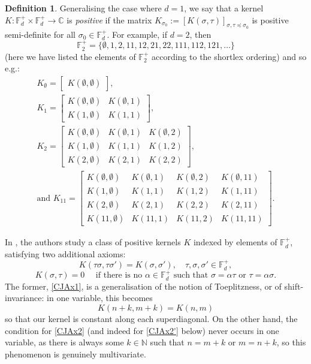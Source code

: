 \documentclass[11pt,reqno]{amsart}
\def\a{\alpha}
\def\s{\sigma}
\def\t{\tau}
\def\NN{\mathbb{N}}
\def\CC{\mathbb{C}}
\def\FF{\mathbb{F}}
\theoremstyle{definition}
\newtheorem{definition}[theorem]{Definition}
\numberwithin{equation}{section}
\begin{document}
\begin{definition}
    Generalising the case where \(d = 1\), we say that a kernel \(K : \FF_d^+ \times \FF_d^+ \to \CC\) is \emph{positive} if the matrix \(K_{\s_0} := [K(\s,\t)]_{\s,\t \preceq \s_0}\) is positive semi-definite for all \(\s_0 \in \FF_d^+\). For example, if \(d = 2\), then
    \[
        \FF_2^+ = \{\emptyset, 1, 2, 11, 12, 21, 22, 111, 112, 121, \ldots\}
    \]
    (here we have listed the elements of \(\FF_2^+\) according to the shortlex ordering) and so e.g.:
    \begin{gather*}
        K_{\emptyset} = \begin{bmatrix}K(\emptyset, \emptyset)\end{bmatrix}, \\
        K_{1} = \begin{bmatrix}K(\emptyset, \emptyset) & K(\emptyset, 1) \\ K(1, \emptyset) & K(1,1)\end{bmatrix},  \\
        K_{2} = \begin{bmatrix}K(\emptyset, \emptyset) & K(\emptyset, 1) & K(\emptyset, 2)\\ K(1, \emptyset) & K(1,1) & K(1,2) \\ K(2, \emptyset) & K(2,1) & K(2,2)\end{bmatrix}, \\
        \text{and } K_{11} = \begin{bmatrix}K(\emptyset, \emptyset) & K(\emptyset, 1) & K(\emptyset, 2) & K(\emptyset, 11)\\ K(1, \emptyset) & K(1,1) & K(1,2) & K(1,11) \\ K(2, \emptyset) & K(2,1) & K(2,2) & K(2,11) \\ K(11, \emptyset) & K(11, 1) & K(11,2) & K(11,11)\end{bmatrix}.
    \end{gather*}
\end{definition}

In \cite{CJ02b}, the authors study a class of positive kernels \(K\) indexed by elements of \(\FF_d^+\), satisfying two additional axioms:
\begin{equation}
    \label{CJAx1}
    K(\t \s, \t\s') = K(\s,\s'), \quad \t, \s, \s' \in \FF^+_d,
\end{equation}
\begin{equation}
    \label{CJAx2}
    K(\sigma, \tau) = 0 \quad \text{ if there is no \(\a \in \FF_d^+\) such that \(\s = \a\t\) or \(\t = \a\s\).}
\end{equation}
The former, \eqref{CJAx1}, is a generalisation of the notion of Toeplitzness, or of shift-invariance: in one variable, this becomes
\[
    K(n+k, m+k) = K(n,m)
\]
so that our kernel is constant along each superdiagonal. On the other hand, the condition for \eqref{CJAx2} (and indeed for \eqref{CJAx2'} below) never occurs in one variable, as there is always some \(k \in \NN\) such that \(n = m + k\) or \(m = n + k\), so this phenomenon is genuinely multivariate.
\end{document}
